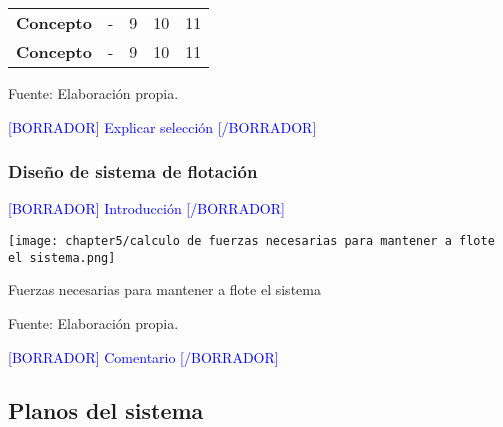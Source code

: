 \begin{mytable}[H]
\begin{tabular}{l|c|c|c|c|}
\begin{minipage}{\mythirdmaxsizeofcontenttable}
		\end{minipage}  \\ \hline
		\multicolumn{1}{|l|}{
			\begin{minipage}{\myforthmaxsizeofcontenttable}			
				\textbf{Concepto}
			\end{minipage}
		} & - & 9 & 10 & 11 \\ \hline
		\multicolumn{1}{|l|}{
			\begin{minipage}{\myforthmaxsizeofcontenttable}			
				\textbf{Concepto}
			\end{minipage}
		} & - & 9 & 10 & 11 \\ \hline
	
	\end{tabular}
	\begin{myflushcenteraftertable}	
		Fuente: Elaboración propia.
	\end{myflushcenteraftertable}
\end{mytable}

\textcolor{blue}{[BORRADOR] Explicar selección [/BORRADOR]} 

\subsubsection{Diseño de sistema de flotación}

\textcolor{blue}{[BORRADOR] Introducción [/BORRADOR]} 

\begin{myfigure}[H]
	\footnotesize\centering
	\texttt{[image: chapter5/calculo de fuerzas necesarias para mantener a flote el sistema.png]}
	\caption{Fuerzas necesarias para mantener a flote el sistema}
	\begin{myflushcenter}
		Fuente: Elaboración propia.
	\end{myflushcenter}
	\label{fig:calculo de fuerzas necesarias para mantener a flote el sistema}
\end{myfigure}

\textcolor{blue}{[BORRADOR] Comentario [/BORRADOR]} 

\subsection{Planos del sistema}
\label{ssec:planos del sistema}

